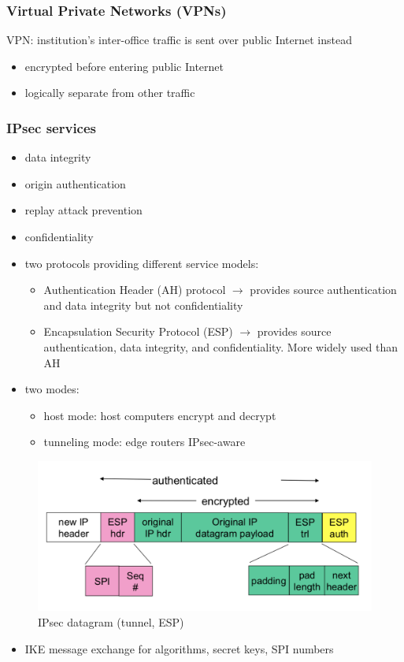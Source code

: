 \subsubsection{Virtual Private Networks (VPNs)}
VPN: institution's inter-office traffic is sent over public Internet instead
\begin{itemize}
	\item encrypted before entering public Internet
	\item logically separate from other traffic
\end{itemize}
\subsubsection{IPsec services}
\begin{itemize}
	\item data integrity
	\item origin authentication
	\item replay attack prevention
	\item confidentiality
	\item two protocols providing different service models:
	\begin{itemize}
		\item Authentication Header (AH) protocol $\rightarrow$ provides source authentication and data integrity but not confidentiality
		\item Encapsulation Security Protocol (ESP) $\rightarrow$ provides source authentication, data integrity, and confidentiality. More widely used than AH
	\end{itemize}
	\item two modes:
	\begin{itemize}
		\item host mode: host computers encrypt and decrypt
		\item tunneling mode: edge routers IPsec-aware
	\end{itemize}
\end{itemize}
\begin{figure}[H]
	\includegraphics[width=\linewidth]{ipsec}
	\centering
	\caption{IPsec datagram (tunnel, ESP)}
\end{figure}
\begin{itemize}
	\item IKE message exchange for algorithms, secret keys, SPI numbers
\end{itemize}

